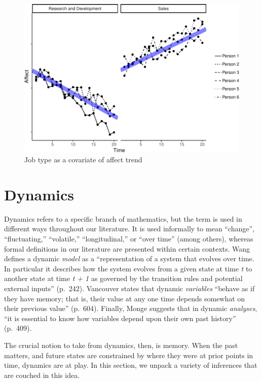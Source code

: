\documentclass[english,,man]{apa6}
\theoremstyle{definition}
\theoremstyle{definition}
\theoremstyle{definition}
\theoremstyle{remark}
\begin{document}
\begin{figure}
\centering
\includegraphics{figures/unnamed-chunk-15-1.pdf}
\caption{\label{fig:unnamed-chunk-15}Job type as a covariate of affect
trend\label{trend_covariate}}
\end{figure}

\hypertarget{dynamics}{%
\section{Dynamics}\label{dynamics}}

Dynamics refers to a specific branch of mathematics, but the term is
used in different ways throughout our literature. It is used informally
to mean \enquote{change}, \enquote{fluctuating,} \enquote{volatile,}
\enquote{longitudinal,} or \enquote{over time} (among others), whereas
formal definitions in our literature are presented within certain
contexts. Wang defines a dynamic \emph{model} as a
\enquote{representation of a system that evolves over time. In
particular it describes how the system evolves from a given state at
time \emph{t} to another state at time \emph{t + 1} as governed by the
transition rules and potential external inputs} (p.~242). Vancouver
states that dynamic \emph{variables} \enquote{behave as if they have
memory; that is, their value at any one time depends somewhat on their
previous value} (p.~604). Finally, Monge suggests that in dynamic
\emph{analyses}, \enquote{it is essential to know how variables depend
upon their own past history} (p.~409).

The crucial notion to take from dynamics, then, is memory. When the past
matters, and future states are constrained by where they were at prior
points in time, dynamics are at play. In this section, we unpack a
variety of inferences that are couched in this idea.
\end{document}
